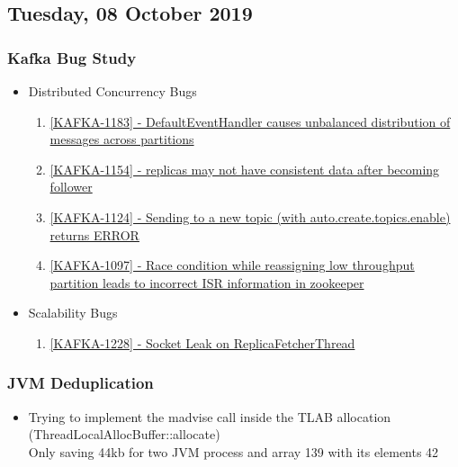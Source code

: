 \subsection{Tuesday, 08 October 2019}

\subsubsection{Kafka Bug Study}
\begin{itemize}
\item Distributed Concurrency Bugs
  \begin{enumerate}
  \item \href{https://issues.apache.org/jira/browse/KAFKA-1183}{[KAFKA-1183] - DefaultEventHandler causes unbalanced distribution of messages across partitions}
  \item \href{https://issues.apache.org/jira/browse/KAFKA-1154}{[KAFKA-1154] - replicas may not have consistent data after becoming follower}
  \item \href{https://issues.apache.org/jira/browse/KAFKA-1124}{[KAFKA-1124] - Sending to a new topic (with auto.create.topics.enable) returns ERROR}
  \item \href{https://issues.apache.org/jira/browse/KAFKA-1097}{[KAFKA-1097] - Race condition while reassigning low throughput partition leads to incorrect ISR information in zookeeper}
  \end{enumerate}

\item Scalability Bugs
  \begin{enumerate}
  \item \href{https://issues.apache.org/jira/browse/KAFKA-1228}{[KAFKA-1228] - Socket Leak on ReplicaFetcherThread}
  \end{enumerate}
\end{itemize}

\subsubsection{JVM Deduplication}
\begin{itemize}
\item Trying to implement the madvise call inside the TLAB allocation (ThreadLocalAllocBuffer::allocate)  \hfill \\ Only saving 44kb for two JVM process and array 139 with its elements 42
\end{itemize}